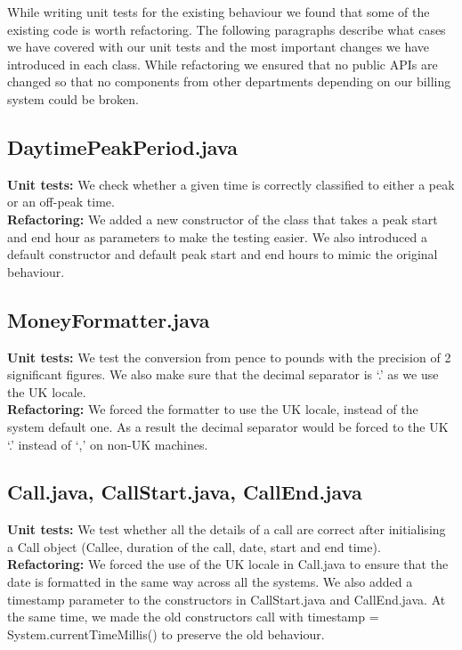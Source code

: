 \documentclass[a4paper]{article}
\begin{document}
While writing unit tests for the existing behaviour we found that some of the existing code is worth refactoring. The following paragraphs describe what cases we have covered with our unit tests and the most important changes we have introduced in each class. While refactoring we ensured that no public APIs are changed so that no components from other departments depending on our billing system could be broken.

\subsection{DaytimePeakPeriod.java}

{\bf Unit tests:} We check whether a given time is correctly classified to either a peak or an off-peak time.
\\{\bf Refactoring:} We added a new constructor of the class that takes a peak start and end hour as parameters to make the testing easier. We also introduced a default constructor and default peak start and end hours to mimic the original behaviour.

\subsection{MoneyFormatter.java}
{\bf Unit tests:} We test the conversion from pence to pounds with the precision of 2 significant figures. We also make sure that the decimal separator is ‘.’ as we use the UK locale.
\\{\bf Refactoring:} We forced the formatter to use the UK locale, instead of the system default one. As a result the decimal separator would be forced to the UK ‘.’ instead of ‘,’ on non-UK machines.

\subsection{Call.java, CallStart.java, CallEnd.java}
{\bf Unit tests:} We test whether all the details of a call are correct after initialising a Call object (Callee, duration of the call, date, start and end time).
\\{\bf Refactoring:} We forced the use of the UK locale in Call.java to ensure that the date is formatted in the same way across all the systems. We also added a timestamp parameter to the constructors in CallStart.java and CallEnd.java. At the same time, we made the old constructors call with timestamp = System.currentTimeMillis() to preserve the old behaviour.
\end{document}
